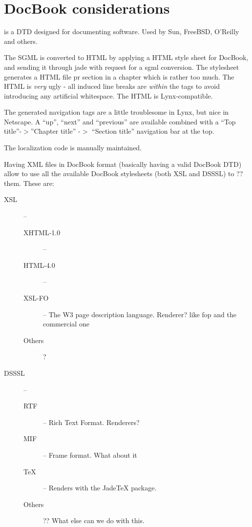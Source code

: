 
\section{DocBook considerations}

 is a DTD designed for
documenting software.  Used by Sun, FreeBSD, O'Reilly and others.

The SGML is converted to HTML by applying a HTML style sheet for
DocBook, and sending it through jade with request for a sgml
conversion.  The stylesheet generates a HTML file pr section in a
chapter which is rather too much.  The HTML is \textit{very} ugly - all
induced line breaks are \textit{within} the tags to avoid introducing any
artificial whitespace.  The HTML is Lynx-compatible.

The generated navigation tags are a little troublesome in Lynx, but
nice in Netscape.  A ``up'', ``next'' and ``previous'' are available
combined with a ``Top title''-$>$''Chapter title'' -$>$ ``Section title''
navigation bar at the top.

The localization code is manually maintained.

Having XML files in DocBook format (basically having a valid DocBook
DTD) allow to use all the available DocBook stylesheets (both XSL and
DSSSL) to \textsf{??} them.  These are:

\begin{description}
\item[XSL] --
  \begin{description}
  \item[XHTML-1.0] -- 
  \item[HTML-\textsf{4.0}] -- 
  \item[XSL-FO] -- The W3 page description language.
    \textsf{Renderer? like fop and the commercial one}
  \item[\textsf{Others}] ?
  \end{description}
\item[DSSSL] --
  \begin{description}
  \item[RTF] -- Rich Text Format.  \textsf{Renderers?}
    
  \item[MIF] -- Frame format.   \textsf{What about it}
  \item[{\TeX}] -- Renders with the \textsf{JadeTeX} package.
  \item[\textsf{Others}] ?? What else can we do with this.
  \end{description}
\end{description}

